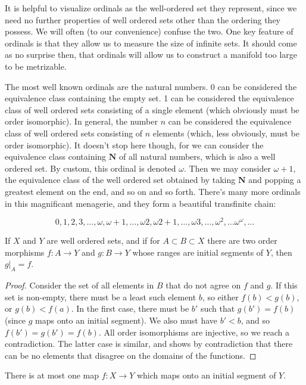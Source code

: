 It is helpful to visualize ordinals as the well-ordered set they represent, since we need no further properties of well ordered sets other than the ordering they possess. We will often (to our convenience) confuse the two. One key feature of ordinals is that they allow us to measure the size of infinite sets. It should come as no surprise then, that ordinals will allow us to construct a manifold too large to be metrizable.

The most well known ordinals are the natural numbers. 0 can be considered the equivalence class containing the empty set. 1 can be considered the equivalence class of well ordered sets consisting of a single element (which obviously must be order isomorphic). In general, the number $n$ can be considered the equivalence class of well ordered sets consisting of $n$ elements (which, less obviously, must be order isomorphic). It doesn't stop here though, for we can consider the equivalence class containing $\mathbf{N}$ of all natural numbers, which is also a well ordered set. By custom, this ordinal is denoted $\omega$. Then we may consider $\omega + 1$, the equivalence class of the well ordered set obtained by taking $\mathbf{N}$ and popping a greatest element on the end, and so on and so forth. There's many more ordinals in this magnificant menagerie, and they form a beautiful transfinite chain:

\[ 0, 1, 2, 3, \dots, \omega, \omega + 1, \dots, \omega 2, \omega 2 + 1, \dots, \omega 3, \dots, \omega^2, \dots \omega^\omega, \dots  \]

\begin{lemma}
    If $X$ and $Y$ are well ordered sets, and if for $A \subset B \subset X$ there are two order morphisms $f:A \to Y$ and $g:B \to Y$ whose ranges are initial segments of $Y$, then $g|_A = f$.
\end{lemma}
\begin{proof}
    Consider the set of all elements in $B$ that do not agree on $f$ and $g$. If this set is non-empty, there must be a least such element $b$, so either $f(b) < g(b)$, or $g(b) < f(a)$. In the first case, there must be $b'$ such that $g(b') = f(b)$ (since $g$ maps onto an initial segment). We also must have $b' < b$, and so $f(b') = g(b') = f(b)$. All order isomorphisms are injective, so we reach a contradiction. The latter case is similar, and shows by contradiction that there can be no elements that disagree on the domains of the functions.
\end{proof}

\begin{corollary}
    There is at most one map $f:X \to Y$ which maps onto an initial segment of $Y$.
\end{corollary}

